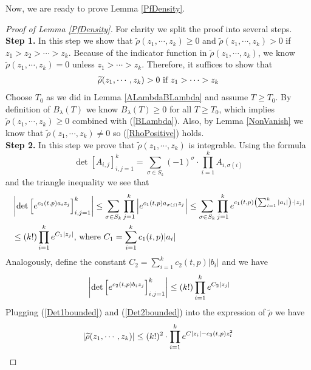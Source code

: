 Now, we are ready to prove Lemma \ref{PfDensity}.
\begin{proof}[Proof of Lemma \ref{PfDensity}] For clarity we split the proof into several steps.\\
\textbf{Step 1. }In this step we show that $\widetilde{\rho}(z_1,\cdots,z_{k})\geq 0$ and $\widetilde{\rho}(z_1,\cdots,z_k)>0$ if $z_1>z_2>\cdots>z_k$. Because of the indicator function in $\widetilde{\rho}(z_1,\cdots,z_k)$, we know $\widetilde{\rho}(z_1,\cdots,z_{k})=0$ unless $z_1>\cdots>z_k$. Therefore, it suffices to show that 
\begin{align}{\label{RhoPositive}}
\widetilde{\rho}(z_1,\cdots,z_k)>0 \text{ if } z_{1}>\cdots>z_k	
\end{align}
Choose $T_{0}$ as we did in Lemma \ref{ALambdaBLambda} and assume $T\geq T_{0}$. By definition of $B_{\lambda}(T)$ we know $B_{\lambda}(T)\geq 0$ for all $T\geq T_{0}$, which implies $\widetilde{\rho}(z_1,\cdots,z_k)\geq 0$ combined with (\ref{BLambda}). Also, by Lemma \ref{NonVanish} we know that $\widetilde{\rho}(z_1,\cdots,z_{k})\neq 0$ so (\ref{RhoPositive}) holds.\\
\textbf{Step 2.} In this step we prove that $\widetilde{\rho}(z_1,\cdots,z_k)$ is integrable. Using the formula $$\det\left[A_{i,j}\right]_{i,j=1}^{k}=\sum_{\sigma\in S_{k}}(-1)^{\sigma}\cdot\prod_{i=1}^{k}A_{i,\sigma(i)}$$ and the triangle inequality we see that 
\begin{equation}{\label{Det1bounded}}
	\begin{split}
		& \left|\det\left[e^{c_1(t,p)a_i z_j}\right]_{i,j=1}^{k}\right|\leq\sum_{\sigma\in S_k}\prod_{j=1}^{k}\left|e^{c_1(t,p)a_{\sigma(j)}z_{j}}\right|\leq \sum_{\sigma\in S_k}\prod_{j=1}^{k}e^{c_1(t,p)\left(\sum_{i=1}^{k}|a_i|\right)\cdot|z_j|}\\
		& \leq (k!)\prod_{i=1}^{k}e^{C_1|z_j|}\text{, where $C_{1}=\sum_{i=1}^{k}c_1(t,p)|a_i|$}
	\end{split}
\end{equation}
Analogously, define the constant $C_2=\sum_{i=1}^{k}c_2(t,p)|b_i|$ and we have
\begin{equation}{\label{Det2bounded}}
	\left|\det\left[e^{c_2(t,p)b_i z_j}\right]_{i,j=1}^{k}\right|\leq (k!)\prod_{i=1}^{k}e^{C_{2}|z_{j}|}
\end{equation} 
Plugging (\ref{Det1bounded}) and (\ref{Det2bounded}) into the expression of $\widetilde{\rho}$ we have 
\begin{align}{\label{Dominate}}
	|\widetilde{\rho}(z_1,\cdots,z_k)|\leq (k!)^2\cdot\prod_{i=1}^{k}e^{C|z_i|-c_3(t,p)z_i^2}

\end{align}
\end{proof}
